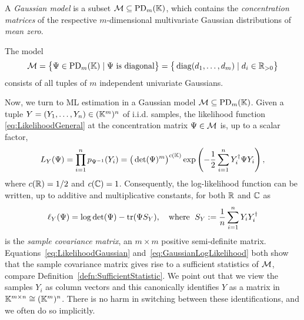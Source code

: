 \begin{defn} \label{defn:GaussianModel}
	A \emph{Gaussian model} is a subset $\mathcal{M} \subseteq \operatorname{PD}_m(\mathbb K)$, which contains the \emph{concentration matrices} of the respective $m$-dimensional multivariate Gaussian distributions of \emph{mean zero}.
	\hfill{}
\end{defn}

\begin{example} \label{ex:mUnivariateGaussiansModel}
	The model
		\[ \mathcal{M} = \big\{ \Psi \in \operatorname{PD}_m(\mathbb K) \mid \Psi \text{ is diagonal} \big\} = \big\{ \operatorname{diag}(d_1,\ldots,d_m) \mid d_i \in \mathbb R_{>0} \big\} \]
	consists of all tuples of $m$ independent univariate Gaussians. %
	\hfill\exSymbol
\end{example}

Now, we turn to ML estimation in a Gaussian model $\mathcal{M} \subseteq \operatorname{PD}_m(\mathbb K)$.
Given a tuple $Y = (Y_1, \ldots, Y_n) \in (\mathbb K^m)^n$ of i.i.d. samples, the likelihood function \eqref{eq:LikelihoodGeneral} at the concentration matrix $\Psi \in \mathcal{M}$ is, up to a scalar factor,
	\begin{equation}\label{eq:LikelihoodGaussian}
		L_Y(\Psi) = \prod_{i=1}^n p_{\Psi^{-1}}(Y_i) = \big( \det(\Psi)^{m} \big)^{c(\mathbb K)} \exp \left( -\frac{1}{2} \sum_{i=1}^n Y_i^{\dagger} \Psi Y_i \right),
	\end{equation}
where $c(\mathbb R) = 1/2$ and $c(\mathbb C) = 1$.
Consequently, the log-likelihood function can be written, up to additive and multiplicative constants, for both $\mathbb R$ and $\mathbb C$ as
\begin{equation}\label{eq:GaussianLogLikelihood}
	\ell_{Y} (\Psi) = \log \det (\Psi) - \operatorname{tr} (\Psi S_Y), \quad \text{where }\; S_Y := \frac{1}{n} \sum_{i=1}^n Y_i Y_i^{\dagger}
\end{equation}
is the \emph{sample covariance matrix}, an $m\times m$ positive semi-definite matrix. Equations~\eqref{eq:LikelihoodGaussian} and~\ref{eq:GaussianLogLikelihood} both show that the sample covariance matrix gives rise to a sufficient statistics of $\mathcal{M}$, compare Definition~\ref{defn:SufficientStatistic}. We point out that we view the samples $Y_i$ as column vectors and this canonically identifies $Y$ as a matrix in $\mathbb K^{m \times n} \cong (\mathbb K^m)^n$. There is no harm in switching between these identifications, and we often do so implicitly.

